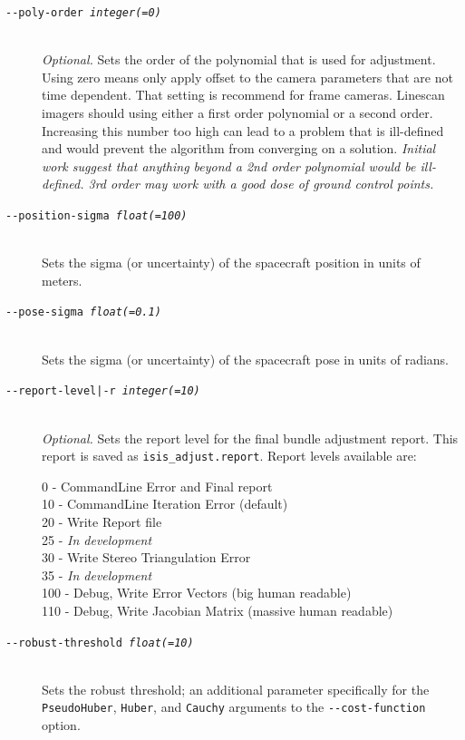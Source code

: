 \begin{description}
\item[\texttt{-\/-poly-order \textit{integer(=0)}}] \hfill \\
  \emph{Optional.} Sets the order of the polynomial that is used for
  adjustment. Using zero means only apply offset to the camera
  parameters that are not time dependent. That setting is recommend
  for frame cameras. Linescan imagers should using either a first
  order polynomial or a second order. Increasing this number too high can
  lead to a problem that is ill-defined and would prevent the algorithm 
	from converging on a solution. \emph{Initial work suggest that anything
    beyond a 2nd order polynomial would be ill-defined. 3rd order may
    work with a good dose of ground control points.}

\item[\texttt{-\/-position-sigma \textit{float(=100)}}] \hfill \\
  Sets the sigma (or uncertainty) of the spacecraft position in
  units of meters.

\item[\texttt{-\/-pose-sigma \textit{float(=0.1)}}] \hfill \\
  Sets the sigma (or uncertainty) of the spacecraft pose in units
  of radians.

\item[\texttt{-\/-report-level|-r \textit{integer(=10)}}] \hfill \\
  \emph{Optional.} Sets the report level for the final bundle
  adjustment report.  This report is saved as
  \texttt{isis\_adjust.report}. Report levels available are:

  \begin{description}
    \item[0   - CommandLine Error and Final report]
    \item[10  - CommandLine Iteration Error (default)]
    \item[20  - Write Report file]
    \item[25  - \textnormal{\emph{In development}}]
    \item[30  - Write Stereo Triangulation Error]
    \item[35  - \textnormal{\emph{In development}}]
    \item[100 - Debug, Write Error Vectors (big human readable)]
    \item[110 - Debug, Write Jacobian Matrix (massive human readable)]
  \end{description}

\item[\texttt{-\/-robust-threshold \textit{float(=10)}}] \hfill \\
  Sets the robust threshold; an additional parameter specifically for
  the \texttt{PseudoHuber}, \texttt{Huber}, and \texttt{Cauchy} arguments to the   \texttt{-\/-cost-function} option.


\end{description}
